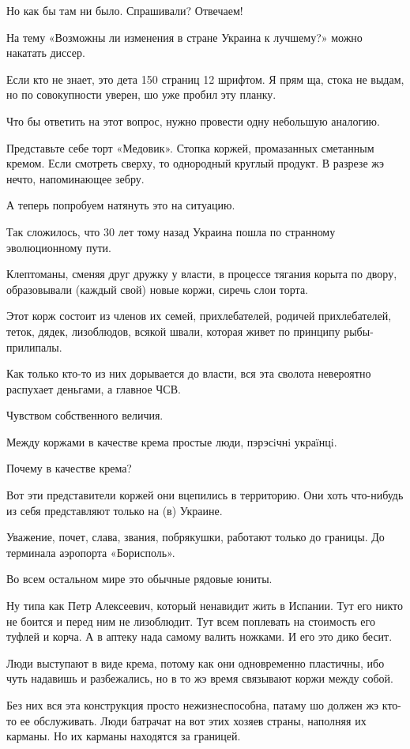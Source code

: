 \begin{multicols}{2}
Но как бы там ни было. Спрашивали? Отвечаем!

На тему «Возможны ли изменения в стране Украина к лучшему?» можно накатать
диссер.

Если кто не знает, это дета 150 страниц 12 шрифтом. Я прям ща, стока не выдам,
но по совокупности уверен, шо уже пробил эту планку.

Что бы ответить на этот вопрос, нужно провести одну небольшую аналогию.

Представьте себе торт «Медовик». Стопка коржей, промазанных сметанным кремом.
Если смотреть сверху, то однородный круглый продукт. В разрезе жэ нечто,
напоминающее зебру.

А теперь попробуем натянуть это на ситуацию.

Так сложилось, что 30 лет тому назад Украина пошла по странному эволюционному
пути.

Клептоманы, сменяя друг дружку у власти, в процессе тягания корыта по двору,
образовывали (каждый свой) новые коржи, сиречь слои торта.

Этот корж состоит из членов их семей, прихлебателей, родичей прихлебателей,
теток, дядек, лизоблюдов, всякой швали, которая живет по принципу
рыбы-прилипалы.

Как только кто-то из них дорывается до власти, вся эта сволота невероятно
распухает деньгами, а главное ЧСВ.

Чувством собственного величия.

Между коржами в качестве крема простые люди, пэрэсiчнi украïнцi.

Почему в качестве крема?

Вот эти представители коржей они вцепились в территорию. Они хоть что-нибудь из
себя представляют только на (в) Украине.

Уважение, почет, слава, звания, побрякушки, работают только до границы. До
терминала аэропорта «Борисполь».

Во всем остальном мире это обычные рядовые юниты.

Ну типа как Петр Алексеевич, который ненавидит жить в Испании. Тут его никто не
боится и перед ним не лизоблюдит. Тут всем поплевать на стоимость его туфлей и
корча. А в аптеку нада самому валить ножками. И его это дико бесит.

Люди выступают в виде крема, потому как они одновременно пластичны, ибо чуть
надавишь и разбежались, но в то жэ время связывают коржи между собой.

Без них вся эта конструкция просто нежизнеспособна, патаму шо должен жэ кто-то
ее обслуживать. Люди батрачат на вот этих хозяев страны, наполняя их карманы.
Но их карманы находятся за границей.


\end{multicols}
